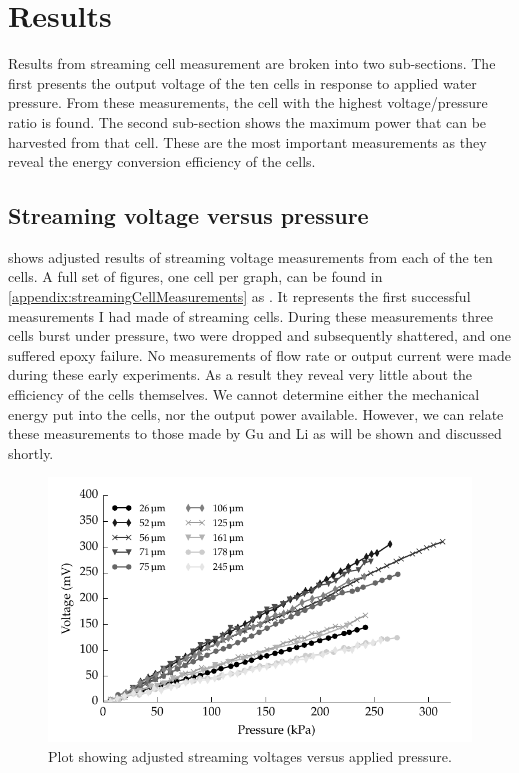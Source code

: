 \section{Results}
  \label{sect:part1_energyHarvesting_results}


  Results from streaming cell measurement are broken into two sub-sections.
  The first presents the output voltage of the ten cells in response to applied water pressure.
  From these measurements, the cell with the highest voltage/pressure ratio is found.
  The second sub-section shows the maximum power that can be harvested from that cell.
  These are the most important measurements as they reveal the energy conversion efficiency of the cells.


  \subsection{Streaming voltage versus pressure}



     shows adjusted results of streaming voltage measurements from each of the ten cells.
    A full set of figures, one cell per graph, can be found in \cref{appendix:streamingCellMeasurements} as .
    It represents the first successful measurements I had made of streaming cells.
    During these measurements three cells burst under pressure, two were dropped and subsequently shattered, and one suffered epoxy failure.
    No measurements of flow rate or output current were made during these early experiments.
    As a result they reveal very little about the efficiency of the cells themselves.
    We cannot determine either the mechanical energy put into the cells, nor the output power available.
    However, we can relate these measurements to those made by Gu and Li as will be shown and discussed shortly.

    \begin{figure}
        \centering
        \includegraphics{content/pt1/01-PowerHarvesting/graphics/graph_streamingVoltageGradient_vs_height}
        \caption{\label{fig:streamingCell_all_adjusted}Plot showing adjusted streaming voltages versus applied pressure.}
    \end{figure}

